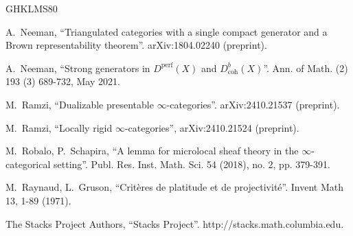\documentclass[11pt,leqno]{amsart}
\numberwithin{equation}{section}
\def\coh{\operatorname{coh}}
\newcommand{\perf}{\operatorname{perf}}
\begin{document}
\begin{thebibliography}{GHKLMS80}



 A.~Neeman, ``Triangulated categories with a single compact generator and a Brown representability theorem''. arXiv:1804.02240 (preprint).

A.~Neeman, ``Strong generators in $D^{\perf}(X)$ and $D^b_{\coh}(X)$''. Ann. of Math. (2) 193 (3) 689-732, May 2021.




 M.~Ramzi, ``Dualizable presentable $\infty$-categories''. arXiv:2410.21537 (preprint).

M.~Ramzi, ``Locally rigid $\infty$-categories'', arXiv:2410.21524 (preprint).

 M.~Robalo, P.~Schapira, ``A lemma for microlocal sheaf theory in the $\infty$-categorical setting''. Publ. Res. Inst. Math. Sci. 54 (2018), no. 2, pp. 379-391.

 M.~Raynaud, L.~Gruson, ``Crit\`eres de platitude et de projectivit\'e''. Invent Math 13, 1-89 (1971).


 The Stacks Project Authors, ``Stacks Project''. http://stacks.math.columbia.edu.


\end{thebibliography}
\end{document}
